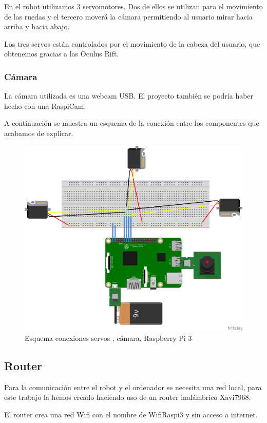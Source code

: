 \documentclass[twoside, 12pt]{epstfg}
\begin{document}
En el robot utilizamos 3 servomotores.
Dos de ellos se utilizan para el movimiento de las ruedas y el tercero moverá la cámara permitiendo al usuario mirar hacia arriba y hacia abajo.

Los tres servos están controlados por el movimiento de la cabeza del usuario, que obtenemos gracias a las Oculus Rift.

\subsubsection{Cámara}

La cámara utilizada es una webcam USB. El proyecto también se podría haber hecho con una RaspiCam.

A continuación se muestra un esquema de la conexión entre los componentes que acabamos de explicar.


\begin{figure}[h]
	\centerline{
		\mbox{\includegraphics[width=.95\textwidth]{images/EsquemaServos.png}}
	}
	\caption{Esquema conexiones servos , cámara, Raspberry Pi 3}
\end{figure}


\subsection{Router}
Para la comunicación entre el robot y el ordenador se necesita una red local,  para este trabajo la hemos creado haciendo uso de un router inalámbrico Xavi7968.

El router crea una red Wifi con el nombre de WifiRaspi3 y sin acceso a internet.
\end{document}
